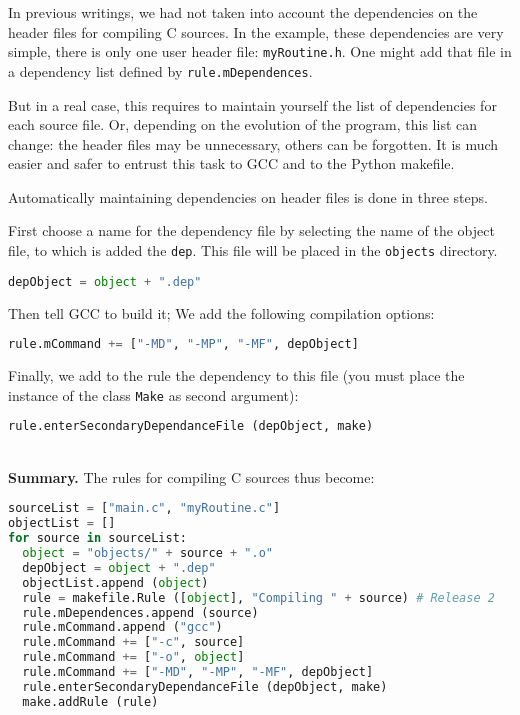 \documentclass[a4paper,11pt]{extarticle}
\begin{document}
In previous writings, we had not taken into account the dependencies on the header files for compiling C sources. In the example, these dependencies are very simple, there is only one user header file: \texttt{myRoutine.h}. One might add that file in a dependency list defined by \texttt{rule.mDependences}.

But in a real case, this requires to maintain yourself the list of dependencies for each source file. Or, depending on the evolution of the program, this list can change: the header files may be unnecessary, others can be forgotten. It is much easier and safer to entrust this task to GCC and to the Python makefile.

Automatically maintaining dependencies on header files is done in three steps.

First choose a name for the dependency file by selecting the name of the object file, to which is added the \texttt{dep}. This file will be placed in the \texttt{objects} directory.
\begin{lstlisting}[language=py]
  depObject = object + ".dep"
\end{lstlisting}

Then tell GCC to build it; We add the following compilation options:
\begin{lstlisting}[language=py]
  rule.mCommand += ["-MD", "-MP", "-MF", depObject]
\end{lstlisting}

Finally, we add to the rule the dependency to this file (you must place the instance of the class \texttt{Make} as second argument):
\begin{lstlisting}[language=py]
  rule.enterSecondaryDependanceFile (depObject, make)
\end{lstlisting}


~\\{\bf Summary.} The rules for compiling C sources thus become:
\begin{lstlisting}[language=py]
sourceList = ["main.c", "myRoutine.c"]
objectList = []
for source in sourceList:
  object = "objects/" + source + ".o"
  depObject = object + ".dep"
  objectList.append (object)
  rule = makefile.Rule ([object], "Compiling " + source) # Release 2
  rule.mDependences.append (source)
  rule.mCommand.append ("gcc")
  rule.mCommand += ["-c", source]
  rule.mCommand += ["-o", object]
  rule.mCommand += ["-MD", "-MP", "-MF", depObject]
  rule.enterSecondaryDependanceFile (depObject, make)
  make.addRule (rule)
\end{lstlisting}
\end{document}
